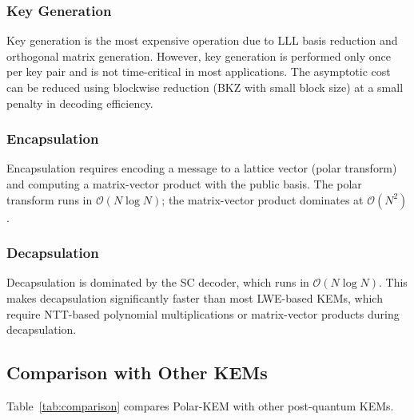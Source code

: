 \documentclass[11pt,a4paper]{article}
\newcommand{\polarKem}{\textsf{Polar-KEM}\xspace}
\begin{document}
\subsubsection{Key Generation}

Key generation is the most expensive operation due to LLL basis reduction and orthogonal matrix generation. However, key generation is performed only once per key pair and is not time-critical in most applications. The asymptotic cost can be reduced using blockwise reduction (BKZ with small block size) at a small penalty in decoding efficiency.

\subsubsection{Encapsulation}

Encapsulation requires encoding a message to a lattice vector (polar transform) and computing a matrix-vector product with the public basis. The polar transform runs in $\mathcal{O}(N \log N)$; the matrix-vector product dominates at $\mathcal{O}(N^2)$.

\subsubsection{Decapsulation}

Decapsulation is dominated by the SC decoder, which runs in $\mathcal{O}(N \log N)$. This makes decapsulation significantly faster than most LWE-based KEMs, which require NTT-based polynomial multiplications or matrix-vector products during decapsulation.

\subsection{Comparison with Other KEMs}\label{sec:comparison}

Table~\ref{tab:comparison} compares \polarKem with other post-quantum KEMs.
\end{document}
